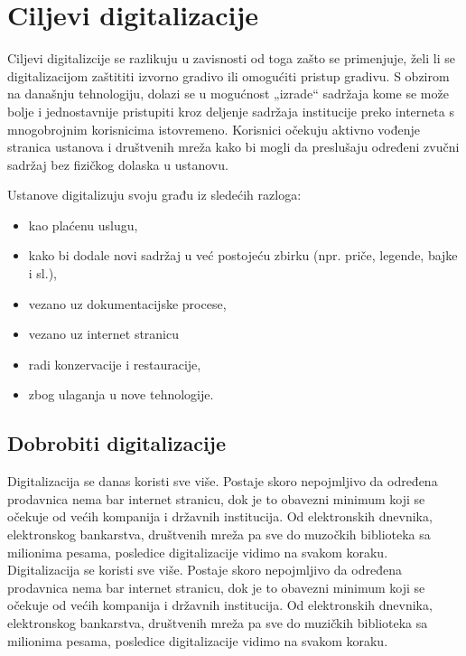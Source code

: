 \documentclass[a4paper]{article}
\begin{document}
\section{Ciljevi digitalizacije}
\label{sec:naslovN}

Ciljevi digitalizcije se razlikuju u zavisnosti od toga zašto se primenjuje, želi li se
digitalizacijom zaštititi izvorno gradivo ili omogućiti pristup gradivu. S obzirom na današnju tehnologiju, dolazi se u mogućnost „izrade“ sadržaja kome se može bolje i
jednostavnije pristupiti kroz deljenje sadržaja institucije preko interneta s mnogobrojnim korisnicima istovremeno. Korisnici očekuju aktivno vođenje stranica ustanova i društvenih
mreža kako bi mogli da preslušaju određeni zvučni sadržaj bez fizičkog dolaska u ustanovu.
 
Ustanove digitalizuju svoju građu iz sledećih razloga:

\begin{itemize}
  \item kao plaćenu uslugu,
  \item kako bi dodale novi sadržaj u već postojeću zbirku (npr. priče, legende, bajke i sl.),
  \item vezano uz dokumentacijske procese,
  \item vezano uz internet stranicu
  \item radi konzervacije i restauracije,
  \item zbog ulaganja u nove tehnologije.
\end{itemize}

\subsection{Dobrobiti digitalizacije}
\label{sec:naslovM}

Digitalizacija se danas koristi sve više. Postaje skoro nepojmljivo da određena prodavnica nema bar internet stranicu, dok je to obavezni minimum koji se očekuje od većih kompanija i državnih institucija. Od elektronskih dnevnika, elektronskog bankarstva, društvenih mreža pa sve do muzočkih biblioteka sa milionima pesama, posledice digitalizacije vidimo na svakom koraku. 
Digitalizacija se koristi sve više. Postaje skoro nepojmljivo da određena prodavnica nema bar internet stranicu, dok je to obavezni minimum koji se očekuje od većih kompanija i državnih institucija. Od elektronskih dnevnika, elektronskog bankarstva, društvenih mreža pa sve do muzičkih biblioteka sa milionima pesama, posledice digitalizacije vidimo na svakom koraku. 
\end{document}
